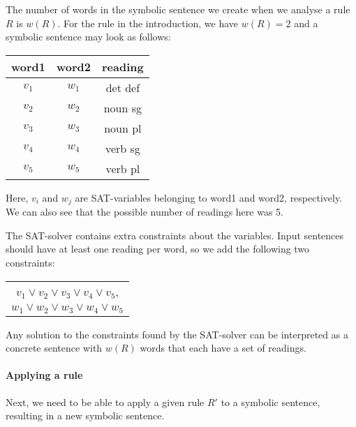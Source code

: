The number of words in the symbolic sentence we create when we analyse a rule $R$ is $w(R)$. For the rule in the introduction, we have $w(R)=2$ and a symbolic sentence may look as follows:
\begin{center}
\begin{tabular}{c|c|c}
word1 & word2 & reading \\
\hline
$v_1$ & $w_1$ & det def \\
$v_2$ & $w_2$ & noun sg \\
$v_3$ & $w_3$ & noun pl \\
$v_4$ & $w_4$ & verb sg \\
$v_5$ & $w_5$ & verb pl \\
\end{tabular}
\end{center}
Here, $v_i$ and $w_j$ are SAT-variables belonging to word1 and word2, respectively. We can also see that the possible number of readings here was 5.

The SAT-solver contains extra constraints about the variables. Input sentences should have at least one reading per word, so we add the following two constraints:
\begin{center}
\begin{tabular}{c}
$v_1 \vee v_2 \vee v_3 \vee v_4 \vee v_5$, \\
$w_1 \vee w_2 \vee w_3 \vee w_4 \vee w_5$ \\
\end{tabular}
\end{center}
Any solution to the constraints found by the SAT-solver can be interpreted as a concrete sentence with $w(R)$ words that each have a set of readings.

\paragraph{Applying a rule}

Next, we need to be able to apply a given rule $R'$ to a symbolic sentence, resulting in a new symbolic sentence.

